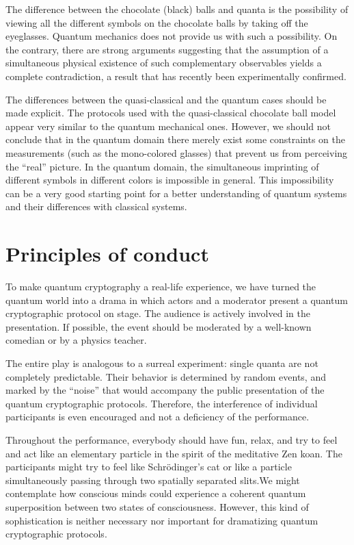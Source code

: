 \documentclass[prb,amssymb,preprint]{revtex4}
\begin{document}
The difference between the chocolate
 (black) balls and quanta is the
possibility of viewing all the different symbols on the chocolate balls by
taking off the eyeglasses. Quantum mechanics does not provide us with such a
possibility. On the contrary, there are strong arguments suggesting that
the assumption of a simultaneous physical existence\cite{epr} of such
complementary observables yields a complete
contradiction,\cite{kochen1,ghz,ghsz} a result that has recently been
experimentally confirmed.\cite{panbdwz}

The differences between the quasi-classical and the quantum cases should be
made explicit. The protocols used with the quasi-classical
chocolate ball model appear very similar to the quantum mechanical ones.
However, we should not conclude that in the quantum domain
there merely exist some constraints on the measurements (such as the
mono-colored glasses) that prevent us from perceiving the ``real''
picture. In the quantum domain, the simultaneous imprinting of different
symbols in different colors is impossible in general. This impossibility
can be a very good starting point for a better understanding of quantum
systems and their differences with classical systems.

\section{Principles of conduct}

To make quantum cryptography a real-life experience, we have turned the
quantum world into a drama in which actors and a moderator present
a quantum cryptographic protocol on stage. The audience is
actively involved in the presentation. If
possible, the event should be moderated by a well-known comedian or by a
physics teacher.


The entire play
is analogous to a surreal
experiment: single quanta are not completely
predictable. Their behavior is determined by random events, and marked by
the ``noise'' that would accompany the public presentation of the quantum
cryptographic protocols. Therefore, the interference of individual
participants is even encouraged and not a deficiency of the performance.

Throughout the performance, everybody should have fun, relax, and try to
feel and act like an elementary particle in the spirit of the meditative
Zen koan.
The participants might try to feel like
Schr\"{o}dinger's cat\cite{schrodinger} or like a particle simultaneously
passing through two spatially separated slits.We might
contemplate how conscious minds could experience a coherent quantum
superposition between two states of consciousness. However, this kind of
sophistication is neither necessary nor important for dramatizing quantum
cryptographic protocols.
\end{document}
